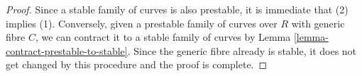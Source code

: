 \documentclass[10pt,a4paper]{amsart}
\theoremstyle{plain}
\theoremstyle{definition}
\theoremstyle{remark}
\numberwithin{equation}{subsection}
\begin{document}
\begin{proof}
Since a stable family of curves is also prestable, it is immediate that
(2) implies (1). Conversely, given a prestable family of curves over $R$
with generic fibre $C$, we can contract it to a stable family of curves
by Lemma \ref{lemma-contract-prestable-to-stable}. Since the generic
fibre already is stable, it does not get changed by this procedure and
the proof is complete.
\end{proof}
\end{document}
